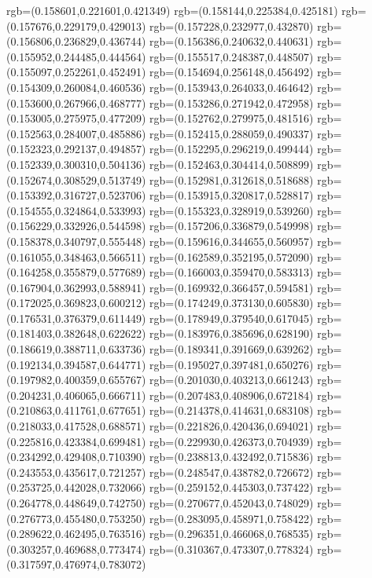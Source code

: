 {{{			rgb=(0.158601,0.221601,0.421349)
			rgb=(0.158144,0.225384,0.425181)
			rgb=(0.157676,0.229179,0.429013)
			rgb=(0.157228,0.232977,0.432870)
			rgb=(0.156806,0.236829,0.436744)
			rgb=(0.156386,0.240632,0.440631)
			rgb=(0.155952,0.244485,0.444564)
			rgb=(0.155517,0.248387,0.448507)
			rgb=(0.155097,0.252261,0.452491)
			rgb=(0.154694,0.256148,0.456492)
			rgb=(0.154309,0.260084,0.460536)
			rgb=(0.153943,0.264033,0.464642)
			rgb=(0.153600,0.267966,0.468777)
			rgb=(0.153286,0.271942,0.472958)
			rgb=(0.153005,0.275975,0.477209)
			rgb=(0.152762,0.279975,0.481516)
			rgb=(0.152563,0.284007,0.485886)
			rgb=(0.152415,0.288059,0.490337)
			rgb=(0.152323,0.292137,0.494857)
			rgb=(0.152295,0.296219,0.499444)
			rgb=(0.152339,0.300310,0.504136)
			rgb=(0.152463,0.304414,0.508899)
			rgb=(0.152674,0.308529,0.513749)
			rgb=(0.152981,0.312618,0.518688)
			rgb=(0.153392,0.316727,0.523706)
			rgb=(0.153915,0.320817,0.528817)
			rgb=(0.154555,0.324864,0.533993)
			rgb=(0.155323,0.328919,0.539260)
			rgb=(0.156229,0.332926,0.544598)
			rgb=(0.157206,0.336879,0.549998)
			rgb=(0.158378,0.340797,0.555448)
			rgb=(0.159616,0.344655,0.560957)
			rgb=(0.161055,0.348463,0.566511)
			rgb=(0.162589,0.352195,0.572090)
			rgb=(0.164258,0.355879,0.577689)
			rgb=(0.166003,0.359470,0.583313)
			rgb=(0.167904,0.362993,0.588941)
			rgb=(0.169932,0.366457,0.594581)
			rgb=(0.172025,0.369823,0.600212)
			rgb=(0.174249,0.373130,0.605830)
			rgb=(0.176531,0.376379,0.611449)
			rgb=(0.178949,0.379540,0.617045)
			rgb=(0.181403,0.382648,0.622622)
			rgb=(0.183976,0.385696,0.628190)
			rgb=(0.186619,0.388711,0.633736)
			rgb=(0.189341,0.391669,0.639262)
			rgb=(0.192134,0.394587,0.644771)
			rgb=(0.195027,0.397481,0.650276)
			rgb=(0.197982,0.400359,0.655767)
			rgb=(0.201030,0.403213,0.661243)
			rgb=(0.204231,0.406065,0.666711)
			rgb=(0.207483,0.408906,0.672184)
			rgb=(0.210863,0.411761,0.677651)
			rgb=(0.214378,0.414631,0.683108)
			rgb=(0.218033,0.417528,0.688571)
			rgb=(0.221826,0.420436,0.694021)
			rgb=(0.225816,0.423384,0.699481)
			rgb=(0.229930,0.426373,0.704939)
			rgb=(0.234292,0.429408,0.710390)
			rgb=(0.238813,0.432492,0.715836)
			rgb=(0.243553,0.435617,0.721257)
			rgb=(0.248547,0.438782,0.726672)
			rgb=(0.253725,0.442028,0.732066)
			rgb=(0.259152,0.445303,0.737422)
			rgb=(0.264778,0.448649,0.742750)
			rgb=(0.270677,0.452043,0.748029)
			rgb=(0.276773,0.455480,0.753250)
			rgb=(0.283095,0.458971,0.758422)
			rgb=(0.289622,0.462495,0.763516)
			rgb=(0.296351,0.466068,0.768535)
			rgb=(0.303257,0.469688,0.773474)
			rgb=(0.310367,0.473307,0.778324)
			rgb=(0.317597,0.476974,0.783072)
}}}
